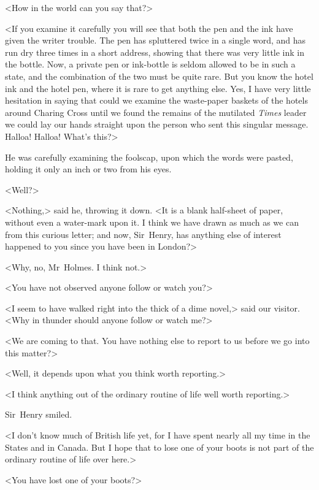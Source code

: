 <How in the world can you say that?>

<If you examine it carefully you will see that both the pen and the ink have given the writer trouble. The pen has spluttered twice in a single word, and has run dry three times in a short address, showing that there was very little ink in the bottle. Now, a private pen or ink-bottle is seldom allowed to be in such a state, and the combination of the two must be quite rare. But you know the hotel ink and the hotel pen, where it is rare to get anything else. Yes, I have very little hesitation in saying that could we examine the waste-paper baskets of the hotels around Charing Cross until we found the remains of the mutilated \textit{Times} leader we could lay our hands straight upon the person who sent this singular message. Halloa! Halloa! What's this?>

He was carefully examining the foolscap, upon which the words were pasted, holding it only an inch or two from his eyes.

<Well?>

<Nothing,> said he, throwing it down. <It is a blank half-sheet of paper, without even a water-mark upon it. I think we have drawn as much as we can from this curious letter; and now, Sir~Henry, has anything else of interest happened to you since you have been in London?>

<Why, no, Mr~Holmes. I think not.>

<You have not observed anyone follow or watch you?>

<I seem to have walked right into the thick of a dime novel,> said our visitor. <Why in thunder should anyone follow or watch me?>

<We are coming to that. You have nothing else to report to us before we go into this matter?>

<Well, it depends upon what you think worth reporting.>

<I think anything out of the ordinary routine of life well worth reporting.>

Sir~Henry smiled.



<I don't know much of British life yet, for I have spent nearly all my time in the States and in Canada. But I hope that to lose one of your boots is not part of the ordinary routine of life over here.>

<You have lost one of your boots?>



